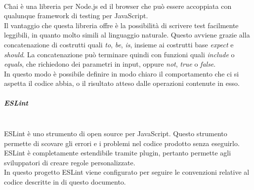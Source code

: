 \mbox{}\\
Chai è una libreria  per Node.js ed il browser che può essere accoppiata con qualunque framework di testing per JavaScript.\\
Il vantaggio che questa libreria offre è la possibilità di scrivere test facilmente leggibili, in quanto molto simili al linguaggio naturale. Questo avviene grazie alla concatenazione di costrutti quali \textit{to}, \textit{be}, \textit{is}, insieme ai costrutti base \textit{expect} e \textit{should}. La concatenazione può terminare quindi con funzioni quali \textit{include} o \textit{equals}, che richiedono dei parametri in input, oppure \textit{not}, \textit{true} o \textit{false}.\\
In questo modo è possibile definire in modo chiaro il comportamento che ci si aspetta il codice abbia, o il risultato atteso dalle operazioni contenute in esso.

\subparagraph{ESLint} \label{sec:eslint}\mbox{}\\
ESLint è uno strumento di  open source per JavaScript. Questo strumento permette di scovare gli errori e i problemi nel codice prodotto senza eseguirlo. ESLint è completamente estendibile tramite plugin, pertanto permette agli sviluppatori di creare regole personalizzate.\\
In questo progetto ESLint viene configurato per seguire le convenzioni relative al codice descritte in  di questo documento.

